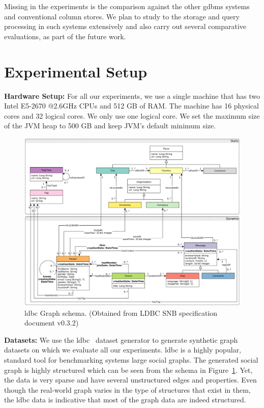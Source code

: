 Missing in the experiments is the comparison against the other \gls{gdbms} systems and conventional column stores. We plan to study to the storage and query processing in such systems extensively and also carry out several comparative evaluations, as part of the future work.

\section{Experimental Setup}

\noindent \textbf{Hardware Setup:} For all our experiments, we use a single machine that has two Intel E5-2670 @2.6GHz CPUs and 512 GB of RAM. The machine has 16 physical cores and 32 logical cores. We only use one logical core. We set the maximum size of the JVM heap to 500 GB and keep JVM’s default minimum size.

\begin{figure}
	\centering
	\includegraphics[scale=0.42]{img/ldbc-schema}
	\captionsetup{justification=centering}
	\caption{\gls{ldbc} Graph schema. (Obtained from LDBC SNB specification document v0.3.2)}
	\label{fig:ldbc-schema}
\end{figure}

\noindent \textbf{Datasets:} We use the \gls{ldbc}~\cite{ldbc} dataset generator to generate synthetic graph datasets on which we evaluate all our experiments. \gls{ldbc} is a highly popular, standard tool for benchmarking systems large social graphs. The generated social graph is highly structured which can be seen from the schema in Figure~\ref{fig:ldbc-schema}. Yet, the data is very sparse and have several unstructured edges and properties. Even though the real-world graph varies in the type of structures that exist in them, the \gls{ldbc} data is indicative that most of the graph data are indeed structured.

